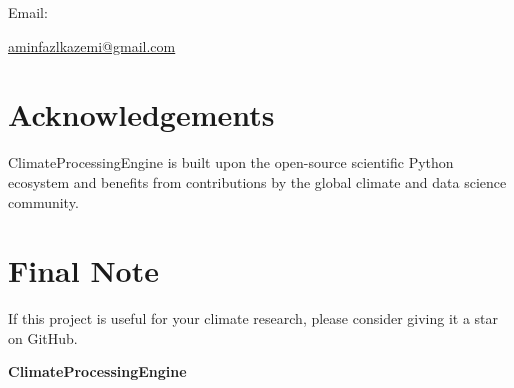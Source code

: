 \documentclass[11pt,a4paper]{article}
\begin{document}
Email:


\url{aminfazlkazemi@gmail.com}





\section*{Acknowledgements}



ClimateProcessingEngine is built upon the open-source scientific Python ecosystem
and benefits from contributions by the global climate and data science community.





\section*{Final Note}



If this project is useful for your climate research,
please consider giving it a star on GitHub.



\begin{center}

\textbf{ClimateProcessingEngine}

\end{center}
\end{document}
